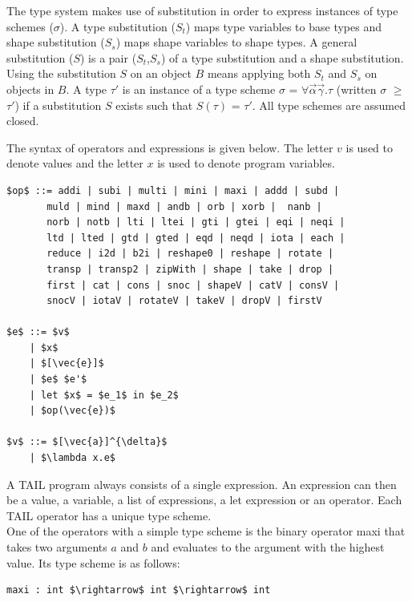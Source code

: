 \documentclass[11pt]{article}
\begin{document}
The type system makes use of substitution in order to express instances of type schemes ($\sigma$).
A type substitution ($S_t$) maps type variables to base types and shape substitution ($S_s$) maps shape variables to shape types.
A general substitution ($S$) is a pair ($S_t$,$S_s$) of a type substitution and a shape substitution.
Using the substitution $S$ on an object $B$ means applying both $S_t$ and $S_s$ on objects in $B$.
A type $\tau'$ is an instance of a type scheme $\sigma$ = $\forall\vec{\alpha}\vec{\gamma}$.$\tau$ (written $\sigma$ $\geq$ $\tau'$) if a substitution $S$ exists such that $S(\tau)$ = $\tau'$. All type schemes are assumed closed.

The syntax of operators and expressions is given below. The letter $v$ is used to denote values and the letter $x$ is used to denote program variables. 
\begin{lstlisting}[numbers=none,frame=none]
$op$ ::= addi | subi | multi | mini | maxi | addd | subd | 
       muld | mind | maxd | andb | orb | xorb |  nanb | 
       norb | notb | lti | ltei | gti | gtei | eqi | neqi |
       ltd | lted | gtd | gted | eqd | neqd | iota | each |
       reduce | i2d | b2i | reshape0 | reshape | rotate |
       transp | transp2 | zipWith | shape | take | drop |
       first | cat | cons | snoc | shapeV | catV | consV | 
       snocV | iotaV | rotateV | takeV | dropV | firstV 

$e$ ::= $v$ 
    | $x$ 
    | $[\vec{e}]$ 
    | $e$ $e'$ 
    | let $x$ = $e_1$ in $e_2$ 
    | $op(\vec{e})$

$v$ ::= $[\vec{a}]^{\delta}$
    | $\lambda x.e$
\end{lstlisting}
A TAIL program always consists of a single expression. An expression can then be a value, a variable, 
a list of expressions, a let expression or an operator. Each TAIL operator has a unique type scheme. \\

One of the operators with a simple type scheme is the binary operator maxi that takes two arguments $a$ and $b$ and evaluates to the argument with the highest value. Its type scheme is as follows:
\begin{lstlisting}[numbers=none,frame=none]
maxi : int $\rightarrow$ int $\rightarrow$ int
\end{lstlisting}
\end{document}
